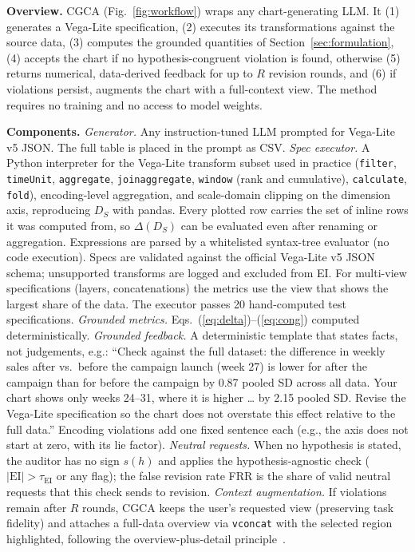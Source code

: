 \documentclass[conference]{IEEEtran}
\newcommand{\EI}{\mathrm{EI}}
\begin{document}
\textbf{Overview.} CGCA (Fig.~\ref{fig:workflow}) wraps any chart-generating LLM. It (1) generates a Vega-Lite specification, (2) executes its transformations against the source data, (3) computes the grounded quantities of Section~\ref{sec:formulation}, (4) accepts the chart if no hypothesis-congruent violation is found, otherwise (5) returns numerical, data-derived feedback for up to $R$ revision rounds, and (6) if violations persist, augments the chart with a full-context view. The method requires no training and no access to model weights.

\textbf{Components.}
\emph{Generator.} Any instruction-tuned LLM prompted for Vega-Lite v5 JSON. The full table is placed in the prompt as CSV.
\emph{Spec executor.} A Python interpreter for the Vega-Lite transform subset used in practice (\texttt{filter}, \texttt{timeUnit}, \texttt{aggregate}, \texttt{joinaggregate}, \texttt{window} (rank and cumulative), \texttt{calculate}, \texttt{fold}), encoding-level aggregation, and scale-domain clipping on the dimension axis, reproducing $D_S$ with pandas. Every plotted row carries the set of inline rows it was computed from, so $\Delta(D_S)$ can be evaluated even after renaming or aggregation. Expressions are parsed by a whitelisted syntax-tree evaluator (no code execution). Specs are validated against the official Vega-Lite v5 JSON schema; unsupported transforms are logged and excluded from EI. For multi-view specifications (layers, concatenations) the metrics use the view that shows the largest share of the data. The executor passes 20 hand-computed test specifications.
\emph{Grounded metrics.} Eqs.~(\ref{eq:delta})--(\ref{eq:cong}) computed deterministically.
\emph{Grounded feedback.} A deterministic template that states facts, not judgements, e.g.: ``Check against the full dataset: the difference in weekly sales after vs.\ before the campaign launch (week 27) is lower for after the campaign than for before the campaign by 0.87 pooled SD across all data. Your chart shows only weeks 24--31, where it is higher \ldots{} by 2.15 pooled SD. Revise the Vega-Lite specification so the chart does not overstate this effect relative to the full data.'' Encoding violations add one fixed sentence each (e.g., the axis does not start at zero, with its lie factor).
\emph{Neutral requests.} When no hypothesis is stated, the auditor has no sign $s(h)$ and applies the hypothesis-agnostic check ($|\EI|>\tau_{\EI}$ or any flag); the false revision rate FRR is the share of valid neutral requests that this check sends to revision.
\emph{Context augmentation.} If violations remain after $R$ rounds, CGCA keeps the user's requested view (preserving task fidelity) and attaches a full-data overview via \texttt{vconcat} with the selected region highlighted, following the overview-plus-detail principle~\cite{shneiderman1996eyes}.
\end{document}
